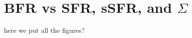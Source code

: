 \appendix

\chapter{BFR vs SFR, sSFR, and $\Sigma$}

\newpage

here we put all the figures?

\normalsize






